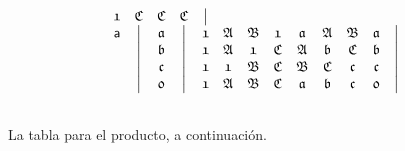 \documentclass[final,12pt,a4paper,twoside,fleqn]{extbook}
\theoremstyle{definition}
\theoremstyle{remark}
\begin{document}
\begin{equation}
\begin{array}{@{}*{22}c@{}}
      {\mathfrak{1}} &%
      {\mathfrak{C}} &%
      {\mathfrak{C}} &%
      {\mathfrak{C}} &%
      \big\vert       %
      \\ \nonumber
      {\textsf{a}}   &%
      \big\vert      &%
      {\mathfrak{a}} &%
      \big\vert      &%
      {\mathfrak{1}} &%
      {\mathfrak{A}} &%
      {\mathfrak{B}} &%
      {\mathfrak{1}} &%
      {\mathfrak{a}} &%
      {\mathfrak{A}} &%
      {\mathfrak{B}} &%
      {\mathfrak{a}} &%
      \big\vert       %
      \\ \nonumber
      {}             &%
      \big\vert      &%
      {\mathfrak{b}} &%
      \big\vert      &%
      {\mathfrak{1}} &%
      {\mathfrak{A}} &%
      {\mathfrak{1}} &%
      {\mathfrak{C}} &%
      {\mathfrak{A}} &%
      {\mathfrak{b}} &%
      {\mathfrak{C}} &%
      {\mathfrak{b}} &%
      \big\vert       %
      \\ \nonumber
      {}             &%
      \big\vert      &%
      {\mathfrak{c}} &%
      \big\vert      &%
      {\mathfrak{1}} &%
      {\mathfrak{1}} &%
      {\mathfrak{B}} &%
      {\mathfrak{C}} &%
      {\mathfrak{B}} &%
      {\mathfrak{C}} &%
      {\mathfrak{c}} &%
      {\mathfrak{c}} &%
      \big\vert       %
      \\ \nonumber
      {}             &%
      \big\vert      &%
      {\mathfrak{0}} &%
      \big\vert      &%
      {\mathfrak{1}} &%
      {\mathfrak{A}} &%
      {\mathfrak{B}} &%
      {\mathfrak{C}} &%
      {\mathfrak{a}} &%
      {\mathfrak{b}} &%
      {\mathfrak{c}} &%
      {\mathfrak{0}} &%
      \big\vert       %
      \\ \nonumber
    \end{array}
\end{equation}





	La tabla para el producto, a continuación.
\end{document}
